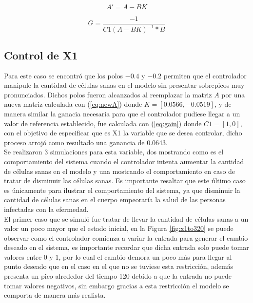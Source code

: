 \documentclass{article}
\begin{document}
\begin{equation}\label{eq:newA}
    A' = A-BK
\end{equation}

\begin{equation}\label{eq:gain}
    G = \frac{-1}{C1 (A-BK)^{-1} * B}
\end{equation}

\subsection{Control de X1}

Para este caso se encontró que los polos $-0.4$ y $-0.2$ permiten que el
controlador manipule la cantidad de células sanas en el modelo sin presentar
sobrepicos muy pronunciados. Dichos polos fueron alcanzados al reemplazar la
matriz $A$ por una nueva matriz calculada con (\ref{eq:newA}) donde $K=[0.0566,
-0.0519]$, y de manera similar la ganacia necesaria para que el
controlador pudiese llegar a un valor de referencia establecido, fue
calculada con (\ref{eq:gain}) donde $C1 = [1, 0]$, con el objetivo de
especificar que es X1 la variable que se desea controlar, dicho proceso
arrojó como resultado una ganancia de 0.0643.\\

Se realizaron 3 simulaciones para esta variable, dos mostrando como es el
comportamiento del sistema cuando el controlador intenta aumentar la cantidad
de células sanas en el modelo y una mostrando el comportamiento en
caso de tratar de disminuir las células sanas. Es importante resaltar que este
último caso es únicamente para ilustrar el comportamiento del sistema, ya que
disminuir la cantidad de células sanas en el cuerpo empeoraría la salud de las
personas infectadas con la efermedad.\\

El primer caso que se simuló fue tratar de llevar la cantidad de células sanas
a un valor un poco mayor que el estado inicial, en la Figura \ref{fig:x1to320} se
puede observar como el controlador comienza a variar la entrada para generar el
cambio deseado en el sistema, es importante recordar que dicha entrada solo puede
tomar valores entre 0 y 1, por lo cual el cambio demora un poco más para llegar
al punto deseado que en el caso en el que no se tuviese esta restricción, además
presenta un pico alrededor del tiempo 120 debido a que la entrada
no puede tomar valores negativos, sin embargo gracias a esta
restricción el modelo se comporta de manera más realista.
\end{document}

